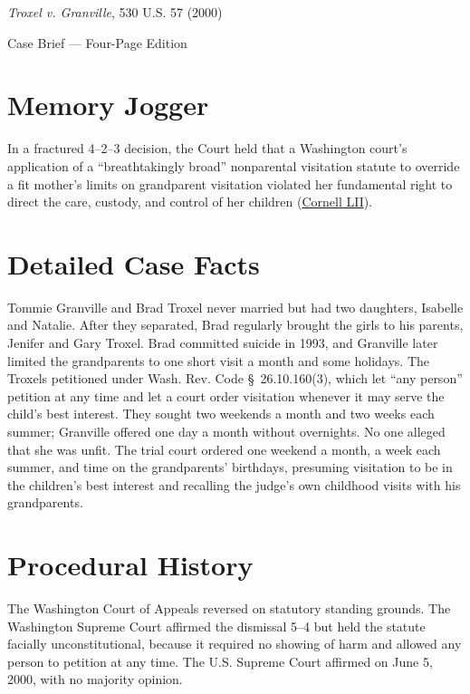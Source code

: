 \documentclass[12pt]{article}
\begin{document}
\begin{center}
{\LARGE \textit{Troxel v. Granville}, 530 U.S. 57 (2000)\par}
\vspace{0.8em}
{\large Case Brief --- Four-Page Edition\par}
\end{center}
\vspace{1em}

\section{Memory Jogger}

In a fractured 4--2--3 decision, the Court held that a Washington court's application of a ``breathtakingly broad'' nonparental visitation statute to override a fit mother's limits on grandparent visitation violated her fundamental right to direct the care, custody, and control of her children (\href{https://www.law.cornell.edu/supremecourt/text/99-138}{Cornell LII}).

\section{Detailed Case Facts}

Tommie Granville and Brad Troxel never married but had two daughters, Isabelle and Natalie. After they separated, Brad regularly brought the girls to his parents, Jenifer and Gary Troxel. Brad committed suicide in 1993, and Granville later limited the grandparents to one short visit a month and some holidays. The Troxels petitioned under Wash. Rev. Code \S~26.10.160(3), which let ``any person'' petition at any time and let a court order visitation whenever it may serve the child's best interest. They sought two weekends a month and two weeks each summer; Granville offered one day a month without overnights. No one alleged that she was unfit. The trial court ordered one weekend a month, a week each summer, and time on the grandparents' birthdays, presuming visitation to be in the children's best interest and recalling the judge's own childhood visits with his grandparents.

\section{Procedural History}

The Washington Court of Appeals reversed on statutory standing grounds. The Washington Supreme Court affirmed the dismissal 5--4 but held the statute facially unconstitutional, because it required no showing of harm and allowed any person to petition at any time. The U.S. Supreme Court affirmed on June 5, 2000, with no majority opinion.
\end{document}
